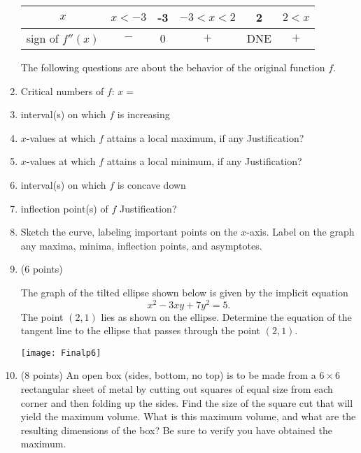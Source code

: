 \documentclass[12pt]{article}
\newcounter{problemnumber}
\newcounter{partnumber}
\newcommand{\Problem}{\stepcounter{problemnumber}\setcounter{partnumber}{0}
       \item[\fbox{\parbox{.18in}{\hfil\theproblemnumber\hfil}}]}
\newcommand{\Points}[1]{(#1 points) \quad}
\begin{document}
\begin{enumerate}
\begin{center}
\bigskip

\begin{tabular}{|c||c|c|c|c|c|}
\hline
$x$ & $x < -3$ & -3 & $-3 < x < 2$ & 2 & $2 < x$ \\ \hline
sign of $f''(x)$ & $-$ & 0 & $+$ & DNE & $+$ \\
\hline
\end{tabular}
\end{center}
\bigskip


The following questions are about the behavior of the original function $f$.
\be
\item Critical numbers of $f$: $x = $ \hrulefill
\vfill
\item  interval(s) on which $f$ is increasing \hrulefill
\vfill
\item $x$-values at which $f$ attains a local maximum, if any \hrulefill
\vfill
Justification? \hrulefill
\vfill
\item $x$-values at which $f$ attains a local minimum, if any \hrulefill
\vfill
Justification? \hrulefill
\vfill
\item interval(s) on which $f$ is concave down \hrulefill
\vfill
\item inflection point(s) of $f$ \hrulefill
\vfill
Justification? \hrulefill
\vfill
\item Sketch the curve, labeling important points on the $x$-axis. Label on the graph any maxima, minima, inflection points, and asymptotes.
\vfill

\ee

\newpage


\Problem\Points{6}

The graph of the tilted ellipse shown below is given by the implicit equation
\[x^2 - 3x y + 7 y^2 = 5.\] The point $(2, 1)$ lies as shown on the ellipse. Determine the equation of the tangent line to the ellipse that passes through the point $(2, 1)$.

\hfill \texttt{[image: Finalp6]}


\newpage
\Problem\Points{8}
An open box (sides, bottom, no top) is to be made from a $6\times 6$ rectangular sheet of metal by cutting out squares of equal size from each corner and then folding up the sides. Find the size of the square cut that will yield the  maximum volume. What is this maximum volume, and what are the resulting dimensions of the box? Be sure to verify you have obtained the maximum.



\end{enumerate}
\end{document}
